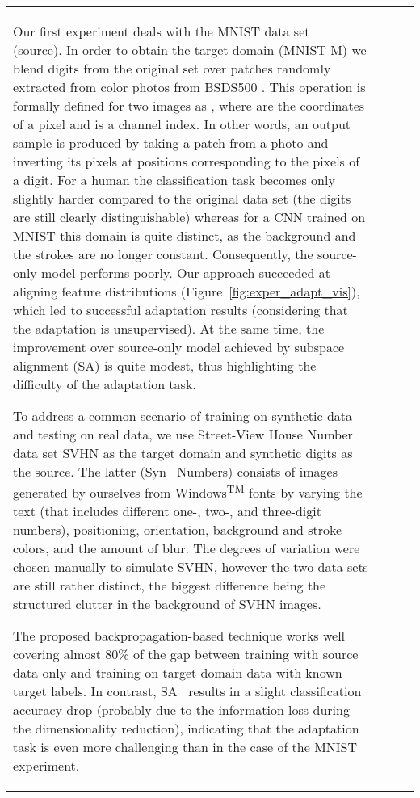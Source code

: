 \documentclass[twoside,11pt]{article}
\newcommand{\fig}[1]{Figure~\ref{fig:#1}}
\begin{document}
\begin{table*}[t]
{\begin{tabular}{lccc}
\vspace{2mm}\noindent {\it MNIST  MNIST-M.}
Our first experiment deals with the MNIST data set~\citep{LeCun98} (source). In order to obtain the target domain ({\sc MNIST-M}) we blend digits from the original set over patches randomly extracted from color photos from BSDS500 \citep{Arbelaez11}. This operation is formally defined for two images  as , where  are the coordinates of a pixel and  is a channel index. In other words, an output sample is produced by taking a patch from a photo and inverting its pixels at positions corresponding to the pixels of a digit. For a human the classification task becomes only slightly harder compared to the original data set (the digits are still clearly distinguishable) whereas for a CNN trained on MNIST this domain is quite distinct, as the background and the strokes are no longer constant. Consequently, the source-only model performs poorly. Our approach succeeded at aligning feature distributions (\fig{exper_adapt_vis}), which led to successful adaptation results (considering that the adaptation is unsupervised). At the same time, the improvement over source-only model achieved by subspace alignment (SA) \citep{Fernando13} is quite modest, thus highlighting the difficulty of the adaptation task. 

\vspace{2mm}\noindent {\it Synthetic numbers  SVHN.}
To address a common scenario of training on synthetic data and testing on  real data, we use Street-View House Number data set {\sc SVHN} \citep{Netzer11} as the target domain and synthetic digits as the source. The latter ({\sc Syn ~Numbers}) consists of  images generated by ourselves from Windows\textsuperscript{\tiny TM} fonts by varying the text (that includes different one-, two-, and three-digit numbers), positioning, orientation, background and stroke colors, and the amount of blur. The degrees of variation were chosen manually to simulate {\sc SVHN}, however the two data sets are still rather distinct, the biggest difference being the structured clutter in the background of {\sc SVHN} images. 

The proposed backpropagation-based technique works well covering almost 80\% of the gap between training with source data only and training on target domain data with known target labels. In contrast, SA~\citep{Fernando13} results in a slight classification accuracy drop (probably due to the information loss during the dimensionality reduction), indicating that the adaptation task is even more challenging than in the case of the {\sc MNIST} experiment.


\end{tabular}}
\end{table*}
\end{document}
